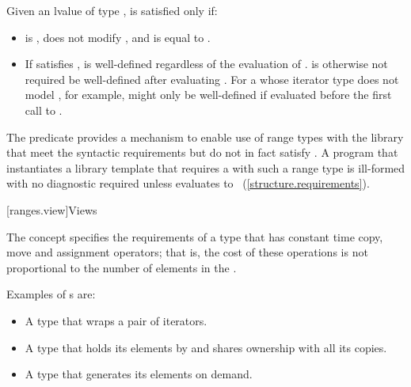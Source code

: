\begin{itemdescr}
\pnum
Given an lvalue  of type ,  is satisfied only if:

\begin{itemize}
\item {} is , does not modify , and is equal
to .

\item If  satisfies ,
 is well-defined regardless of the evaluation of
. \enternote {} is otherwise not required be
well-defined after evaluating . For a 
whose iterator type does not model , for
example,  might only be well-defined if evaluated before
the first call to . \exitnote
\end{itemize}

\pnum
\enternote The  predicate provides a mechanism to enable use
of range types with the library that meet the syntactic requirements but do
not in fact satisfy . A program that instantiates a library template
that requires a  with such a range type  is ill-formed with no
diagnostic required unless
 evaluates
to ~(\ref{structure.requirements}). \exitnote
\end{itemdescr}

[ranges.view]{Views}

\pnum
The  concept specifies the requirements of a
 type that has constant time copy, move and assignment operators; that
is, the cost of these operations is not proportional to the number of elements in
the .

\pnum
\enterexample
Examples of s are:

\begin{itemize}
\item A  type that wraps a pair of iterators.

\item A  type that holds its elements by 
and shares ownership with all its copies.

\item A  type that generates its elements on demand.
\end{itemize}

